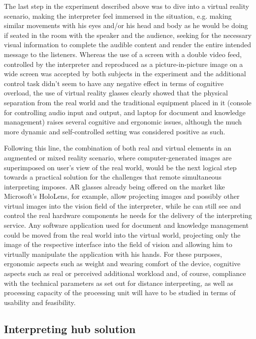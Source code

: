 \documentclass[output=paper]{langsci/langscibook}
\begin{document}
The last step in the experiment described above was to dive into a virtual reality scenario, making the interpreter feel immersed in the situation, e.g. making similar movements with his eyes and/or his head and body as he would be doing if seated in the room with the speaker and the audience, seeking for the necessary visual information to complete the audible content and render the entire intended message to the listeners. Whereas the use of a screen with a double video feed, controlled by the interpreter and reproduced as a picture-in-picture image on a wide screen was accepted by both subjects in the experiment and the additional control task didn’t seem to have any negative effect in terms of cognitive overload, the use of virtual reality glasses clearly showed that the physical separation from the real world and the traditional equipment placed in it (console for controlling audio input and output, and laptop for document and knowledge management) raises several cognitive and ergonomic issues, although the much more dynamic and self-controlled setting was considered positive as such. 

Following this line, the combination of both real and virtual elements in an augmented or mixed reality scenario, where computer-generated images are superimposed on user’s view of the real world, would be the next logical step towards a practical solution for the challenges that remote simultaneous interpreting imposes. \textsc{AR} glasses already being offered on the market like Microsoft’s HoloLens, for example, allow projecting images and possibly other virtual images into the vision field of the interpreter, while he can still see and control the real hardware components he needs for the delivery of the interpreting service. Any software application used for document and knowledge management could be moved from the real world into the virtual world, projecting only the image of the respective interface into the field of vision and allowing him to virtually manipulate the application with his hands. For these purposes, ergonomic aspects such as weight and wearing comfort of the device, cognitive aspects such as real or perceived additional workload and, of course, compliance with the technical parameters as set out for distance interpreting, as well as processing capacity of the processing unit will have to be studied in terms of usability and feasibility.

\subsection{Interpreting hub solution}
\end{document}
